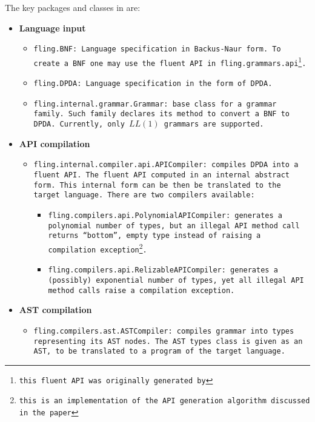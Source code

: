 \documentclass[a4paper,UKenglish,cleveref, autoref]{darts-v2019}
\begin{document}
\begin{content}
The key packages and classes in \Fling are:
\begin{itemize}
	\item \textbf{Language input}
	\begin{itemize}
		\item \tt{fling.BNF}: Language specification in Backus-Naur form.
		To create a \tt{BNF} one may use the fluent API in \tt{fling.grammars.api}\footnote{
			this fluent API was originally generated by \Fling}.
		\item \tt{fling.DPDA}: Language specification in the form of DPDA.
		\item \tt{fling.internal.grammar.Grammar}: base class for a grammar family.
		Such family declares its method to convert a BNF to DPDA. Currently, only~$LL(1)$
		grammars are supported.
	\end{itemize}
	\item \textbf{API compilation}
	\begin{itemize}
		\item \tt{fling.internal.compiler.api.APICompiler}: compiles DPDA into a fluent API.
		The fluent API computed in an internal abstract form. This internal form
    can be then be translated to the target language.
		There are two compilers available:
		\begin{itemize}
			\item \tt{fling.compilers.api.PolynomialAPICompiler}: generates a polynomial number of
			types, but an illegal API method call returns ``bottom'', empty type instead of raising
			a compilation exception\footnote{this is an implementation of the API generation algorithm
			discussed in the paper}.
			\item \tt{fling.compilers.api.RelizableAPICompiler}: generates a (possibly) exponential number of
			types, yet all illegal API method calls raise a compilation exception.
		\end{itemize}
	\end{itemize}
	\item \textbf{AST compilation}
	\begin{itemize}
		\item \tt{fling.compilers.ast.ASTCompiler}: compiles grammar into types representing its AST nodes.
		The AST types class is given as an AST, to be translated to a program of the target language.
	\end{itemize}

\end{itemize}
\end{content}
\end{document}
